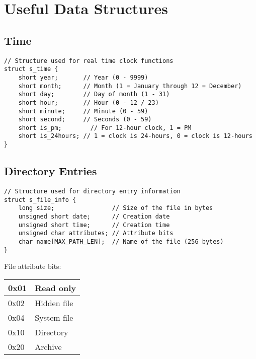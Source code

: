 \section{Useful Data Structures}

\subsection*{Time}
\begin{lstlisting}
// Structure used for real time clock functions
struct s_time {
    short year;       // Year (0 - 9999)
    short month;      // Month (1 = January through 12 = December)
    short day;        // Day of month (1 - 31)
    short hour;       // Hour (0 - 12 / 23)
    short minute;     // Minute (0 - 59)
    short second;     // Seconds (0 - 59)
    short is_pm;	    // For 12-hour clock, 1 = PM
    short is_24hours; // 1 = clock is 24-hours, 0 = clock is 12-hours
}
\end{lstlisting}

\subsection*{Directory Entries}
\begin{lstlisting}
// Structure used for directory entry information
struct s_file_info {
    long size;                // Size of the file in bytes
    unsigned short date;      // Creation date
    unsigned short time;      // Creation time
    unsigned char attributes; // Attribute bits
    char name[MAX_PATH_LEN];  // Name of the file (256 bytes)
}
\end{lstlisting}

File attribute bits:

\bigskip

\begin{tabular}{|l|l|} \hline
0x01 & Read only \\ \hline
0x02 & Hidden file \\ \hline
0x04 & System file \\ \hline
0x10 & Directory \\ \hline
0x20 & Archive \\ \hline
\end{tabular}

